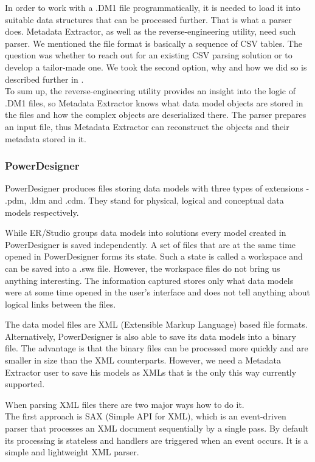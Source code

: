 In order to work with a .DM1 file programmatically, it is needed to load it into suitable data structures that can be processed further. That is what a parser does. 
Metadata Extractor, as well as the reverse-engineering utility,  need such parser.
We mentioned the file format is basically a sequence of CSV tables. 
The question was whether to reach out for an existing CSV parsing solution or to develop a tailor-made one.
We took the second option, why and how we did so is described further in . \\

To sum up, the reverse-engineering utility provides an insight into the logic of .DM1 files, so Metadata Extractor knows what data model objects are stored in the files and how the complex objects are deserialized there. The parser prepares an input file, thus Metadata Extractor can reconstruct the objects and their metadata stored in it.

\subsubsection{PowerDesigner}

PowerDesigner produces files storing data models with three types of extensions - .pdm, .ldm and .cdm.
They stand for physical, logical and conceptual data models respectively.

While ER/Studio groups data models into solutions every model created in PowerDesigner is saved independently. 
A set of files that are at the same time opened in PowerDesigner forms its state. 
Such a state is called a workspace and can be saved into a .sws file. However, the workspace files do not bring us anything interesting. 
The information captured stores only what data models were at some time opened in the user's interface and does not tell anything about logical links between the files.

The data model files are XML (Extensible Markup Language) based file formats.
Alternatively, PowerDesigner is also able to save its data models into a binary file. The advantage is that the binary files can be processed more quickly and are smaller in size than the XML counterparts. 
However, we need a Metadata Extractor user to save his models as XMLs that is the only this way currently supported.

When parsing XML files there are two major ways how to do it. \\

The first approach is SAX (Simple API for XML), which is an event-driven parser that processes an XML document sequentially by a single pass. 
By default its processing is stateless and handlers are triggered when an event occurs. 
It is a simple and lightweight XML parser. \\

